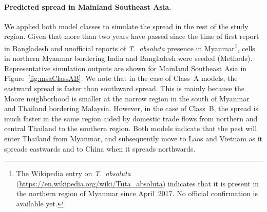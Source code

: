 \documentclass[11pt]{article}
\newcommand{\tuta}{\emph{T.~absoluta}}
\theoremstyle{definition}
\begin{document}
\paragraph{Predicted spread in Mainland Southeast Asia.}
We applied both model classes to simulate the spread in the rest of the
study region. Given that more than two years have passed since the time of
first report in Bangladesh and unofficial reports of \tuta{} presence in
Myanmar\footnote{The Wikipedia entry on \tuta{}
    (\url{https://en.wikipedia.org/wiki/Tuta_absoluta}) indicates
that it is present in the northern region of Myanmar since
April~2017. No official confirmation is available yet.}, cells in northern Myanmar bordering India and Bangladesh were
seeded (Methods). Representative simulation outputs are shown for Mainland
Southeast Asia in Figure~\ref{fig:msaClassAB}. We note that in the case of
Class~A models, the eastward spread is faster than southward spread. This
is mainly because the Moore neighborhood is smaller at the narrow region in
the south of Myanmar and Thailand bordering Malaysia. However, in
the case of Class~B, the spread is much faster in the same region aided by domestic
trade flows from northern and central Thailand to the southern region. Both models indicate that the pest will enter
Thailand from Myanmar, and subsequently move to Laos and Vietnam as it
spreads eastwards and to China when it spreads northwards.
\end{document}
